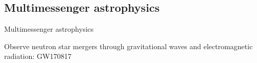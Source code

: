 \documentclass[usenames,dvipsnames,t]{beamer}
\newcommand{\incfig}[2][0.75\textwidth]{%
    \def\svgwidth{\columnwidth}
    \resizebox{#1}{!}{{#2.pdf_tex}}
}
\begin{document}
\subsection{Multimessenger astrophysics}


\begin{frame}{Multimessenger astrophysics}

  \def\x{2mm}
  
  Observe neutron star mergers through gravitational waves and electromagnetic radiation: GW170817~\cite{LIGOScientific:2017vwq, LIGOScientific:2017zic}

\end{frame}




    
    

    







\end{document}
